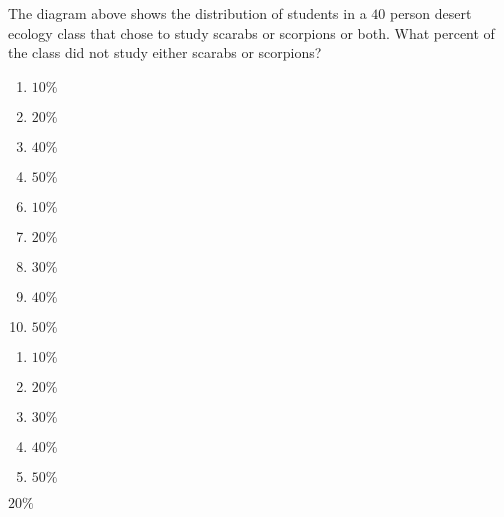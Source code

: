 
The diagram above shows the distribution of students in a $40$ person
desert ecology class that chose to study scarabs or scorpions or both.
What percent of the class did not study either scarabs or scorpions?



\ifsat
	\begin{enumerate}[label=\Alph*)]
		\item $10\%$
		\item $20\%$%
		\item $40\%$
		\item $50\%$
	\end{enumerate}
\else
\fi

\ifacteven
	\begin{enumerate}[label=\textbf{\Alph*.},itemsep=\fill,align=left]
		\setcounter{enumii}{5}
		\item $10\%$
		\item $20\%$%
		\item $30\%$
		\addtocounter{enumii}{1}
		\item $40\%$
		\item $50\%$
	\end{enumerate}
\else
\fi

\ifactodd
	\begin{enumerate}[label=\textbf{\Alph*.},itemsep=\fill,align=left]
		\item $10\%$
		\item $20\%$%
		\item $30\%$
		\item $40\%$
		\item $50\%$
	\end{enumerate}
\else
\fi

\ifgridin
 $20\%$%
		
\else
\fi

